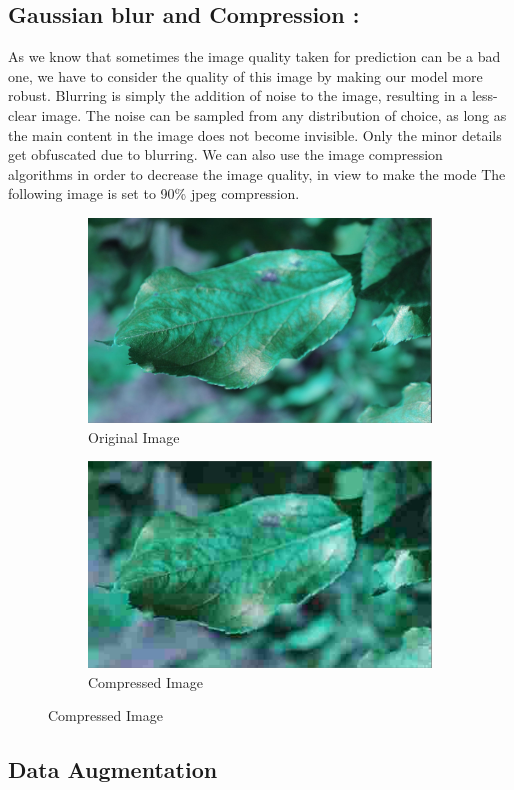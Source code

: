 \documentclass[a4paper]{article}
\begin{document}
\subsection{Gaussian blur and Compression : } 
 As we know that sometimes the image quality taken for prediction can be a bad one,  we have to consider the quality of this image by making our model more robust. 
 Blurring is simply the addition of noise to the image, resulting in a less-clear image. The noise can be sampled from any distribution of choice, as long as the main content in the image does not become invisible. Only the minor details get obfuscated due to blurring.
 We can also use the image compression algorithms in order to decrease the image quality, in view to make the mode
 The following image is set to 90\% jpeg compression.
 
 \begin{figure}[H]
\centering
\begin{subfigure}{\textwidth}
  \centering
  \includegraphics[width=.4\linewidth]{images/ori.png}
  \caption{Original Image}
  \label{fig:sub1}
\end{subfigure}%
\begin{subfigure}{\textwidth}
  \centering
  \includegraphics[width=.4\linewidth]{images/blur.png}
  \caption{Compressed Image}
  \label{fig:sub2}
\end{subfigure}
\label{fig:test}
\end{figure}

\subsection{Data Augmentation}
 
 
\end{document}
